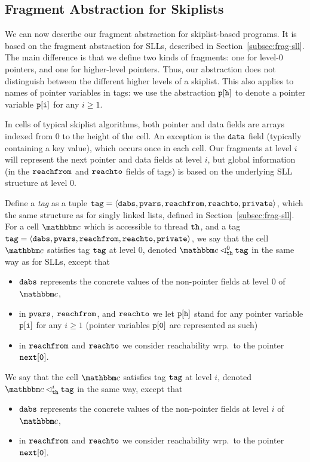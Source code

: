 \subsection{Fragment Abstraction for Skiplists}
We can now describe our fragment abstraction for skiplist-based programs.
It is based on the fragment abstraction for SLLs, described in
Section~\ref{subsec:frag-sll}. The main difference is that we define two
kinds of fragments: one for level-$0$ pointers, and one for higher-level
pointers. Thus, our abstraction does not distinguish between the different
higher levels of a skiplist. This also applies to names of pointer
variables in  tags: we use the abstraction $\mathtt{p[h]}$ to denote a
pointer variable $\mathtt{p[i]}$ for any $i \geq 1$.

In cells of typical skiplist algorithms, both pointer and data fields
are arrays indexed from $0$ to the height of the cell. An exception is
the $\tt data$ field (typically containing a key value), which occurs once
in each cell. Our fragments at level $i$ will represent the next pointer
and data fields at level $i$, but global information (in the
$\mathtt{reachfrom}$ and $\mathtt{reachto}$ fields of tags) is based on
the underlying SLL structure at level $0$.


Define a {\em tag} as a tuple $\mathtt{tag} = \left\langle\mathtt{dabs},\mathtt{pvars},\mathtt{reachfrom},\mathtt{reachto},\mathtt{private}\right\rangle$, which the same
structure as for singly linked lists, defined in Section~\ref{subsec:frag-sll}.
For a cell $\cell$ which is accessible to thread ${\tt th}$, and a tag
$\mathtt{tag} = \left\langle\mathtt{dabs},\mathtt{pvars},\mathtt{reachfrom},\mathtt{reachto},\mathtt{private}\right\rangle$, we say that
the cell $\cell$ satisfies tag $\mathtt{tag}$ at level $0$, denoted
$\cell \satslfrag{\thread}{0} \atag$ in the same way as for SLLs, except that
\begin{itemize}
\item
  $\mathtt{dabs}$ represents the concrete values of the non-pointer fields
  at level $0$ of $\cell$,
\item
  in $\mathtt{pvars}$, $\mathtt{reachfrom}$, and $\mathtt{reachto}$ we let 
  $\mathtt{p[h]}$ stand for any
  pointer variable $\mathtt{p[i]}$ for any $i \geq 1$
  (pointer variables $\mathtt{p[0]}$ are represented as such)
\item
  in $\mathtt{reachfrom}$ and $\mathtt{reachto}$ we consider reachability
  wrp.\ to the pointer $\tt next[0]$.
\end{itemize}
We say that the cell $\cell$ satisfies tag $\mathtt{tag}$ at level $i$, denoted
$\cell \satslfrag{\thread}{i} \atag$ in the same way, except that
\begin{itemize}
\item
  $\mathtt{dabs}$ represents the concrete values of the non-pointer fields
  at level $i$ of $\cell$,
\item
  in $\mathtt{reachfrom}$ and $\mathtt{reachto}$ we consider reachability
  wrp.\ to the pointer $\tt next[0]$.
\end{itemize}

